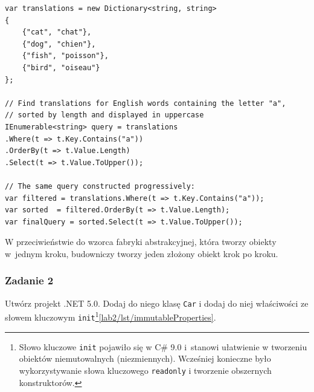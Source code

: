 \begin{lstlisting}[caption={Wykorzystanie płynnych interfejsów w zapytania LINQ}, label={lab2/lst/fluentInterfaceLinq}]
var translations = new Dictionary<string, string>
{
	{"cat", "chat"},
	{"dog", "chien"},
	{"fish", "poisson"},
	{"bird", "oiseau"}
};

// Find translations for English words containing the letter "a",
// sorted by length and displayed in uppercase
IEnumerable<string> query = translations
.Where(t => t.Key.Contains("a"))
.OrderBy(t => t.Value.Length)
.Select(t => t.Value.ToUpper());

// The same query constructed progressively:
var filtered = translations.Where(t => t.Key.Contains("a"));
var sorted  = filtered.OrderBy(t => t.Value.Length);
var finalQuery = sorted.Select(t => t.Value.ToUpper());
\end{lstlisting}

W przeciwieństwie do wzorca fabryki abstrakcyjnej, która tworzy obiekty w~jednym kroku, budowniczy tworzy jeden złożony obiekt krok po kroku.

\subsubsection{Zadanie 2}

Utwórz projekt .NET 5.0. Dodaj do niego klasę \texttt{Car} i dodaj do niej właściwości ze słowem kluczowym \texttt{init}\footnote{Słowo kluczowe \texttt{init} pojawiło się w C\# 9.0 i~stanowi ułatwienie w tworzeniu obiektów niemutowalnych (niezmiennych). Wcześniej konieczne było wykorzystywanie słowa kluczowego \texttt{readonly} i tworzenie obszernych konstruktorów.}\ref{lab2/lst/immutableProperties}. 

